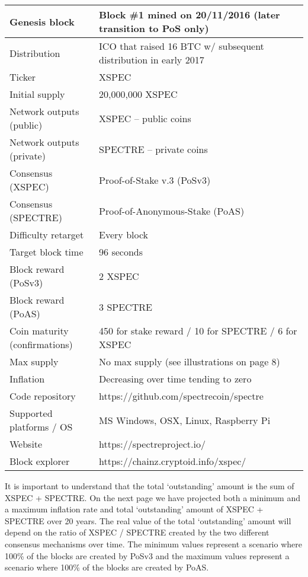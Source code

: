 \begin{tabular}{ |p{4cm}|p{9cm}|  }
	\hline
	Genesis block 				& Block \#1 mined on 20/11/2016 (later transition to PoS only)\\
	\hline
	Distribution  				& ICO that raised 16 BTC w/ subsequent distribution in early 2017\\
	\hline
	Ticker 						& XSPEC\\
	\hline
	Initial supply 				& 20,000,000 XSPEC\\
	\hline
	Network outputs (public) 	& XSPEC – public coins\\
	\hline
	Network outputs (private)	& SPECTRE – private coins\\
	\hline
	Consensus (XSPEC) 			& Proof-of-Stake v.3 (PoSv3)\\
	\hline
	Consensus (SPECTRE) 		& Proof-of-Anonymous-Stake (PoAS)\\
	\hline
	Difficulty retarget 		& Every block\\
	\hline
	Target block time 			& 96 seconds\\
	\hline
	Block reward (PoSv3) 		& 2 XSPEC\\
	\hline
	Block reward (PoAS) 		& 3 SPECTRE\\
	\hline
	Coin maturity (confirmations) 	& 450 for stake reward / 10 for SPECTRE / 6 for XSPEC\\
	\hline
	Max supply 					& No max supply (see illustrations on page 8)\\
	\hline
	Inflation 					& Decreasing over time tending to zero\\
	\hline
	Code repository 			& https://github.com/spectrecoin/spectre\\
	\hline
	Supported platforms / OS 	& MS Windows, OSX, Linux, Raspberry Pi\\
	\hline
	Website 					& https://spectreproject.io/\\
	\hline
	Block explorer 				& https://chainz.cryptoid.info/xspec/\\
	\hline
\end{tabular}



It is important to understand that the total ‘outstanding’ amount is the sum
of XSPEC + SPECTRE. On the next page we have projected both a minimum and a
maximum inflation rate and total ‘outstanding’ amount of XSPEC + SPECTRE over
20 years. The real value of the total ‘outstanding’ amount will depend on the
ratio of XSPEC / SPECTRE created by the two different consensus mechanisms
over time. The minimum values represent a scenario where 100\% of the blocks
are created by PoSv3 and the maximum values represent a scenario where 100\%
of the blocks are created by PoAS.



